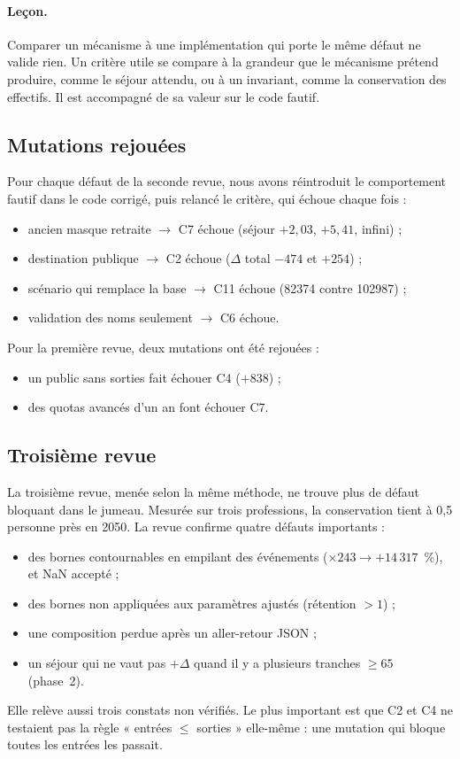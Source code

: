 \paragraph{Leçon.} Comparer un mécanisme à une implémentation qui porte le même défaut ne valide
rien. Un critère utile se compare à la grandeur que le mécanisme prétend produire, comme le séjour
attendu, ou à un invariant, comme la conservation des effectifs. Il est accompagné de sa valeur sur
le code fautif.

\subsection{Mutations rejouées}
Pour chaque défaut de la seconde revue, nous avons réintroduit le comportement fautif dans le code
corrigé, puis relancé le critère, qui échoue chaque fois :
\begin{itemize}
  \item ancien masque retraite $\to$ C7 échoue (séjour $+2{,}03$\mesure{}, $+5{,}41$\mesure{},
        infini) ;
  \item destination publique $\to$ C2 échoue ($\Delta$ total $-474$\mesure{} et $+254$\mesure{}) ;
  \item scénario qui remplace la base $\to$ C11 échoue (\num{82374}\mesure{} contre
        \num{102987}\mesure{}) ;
  \item validation des noms seulement $\to$ C6 échoue.
\end{itemize}
Pour la première revue, deux mutations ont été rejouées :
\begin{itemize}
  \item un public sans sorties fait échouer C4 ($+838$\mesure{}) ;
  \item des quotas avancés d'un an font échouer C7.
\end{itemize}

\subsection{Troisième revue}
La troisième revue, menée selon la même méthode, ne trouve plus de défaut bloquant dans le jumeau.
Mesurée sur trois professions, la conservation tient à 0,5\mesure{} personne près en 2050. La revue
confirme quatre défauts importants :
\begin{itemize}
  \item des bornes contournables en empilant des événements ($\times243 \to +14\,317$\mesure{}~\%),
        et NaN accepté ;
  \item des bornes non appliquées aux paramètres ajustés (rétention $> 1$) ;
  \item une composition perdue après un aller-retour JSON ;
  \item un séjour qui ne vaut pas $+\Delta$ quand il y a plusieurs tranches $\ge 65$ (phase~2).
\end{itemize}
Elle relève aussi trois constats non vérifiés. Le plus important est que C2 et C4 ne testaient pas la
règle « entrées $\le$ sorties » elle-même : une mutation qui bloque toutes les entrées les passait.

